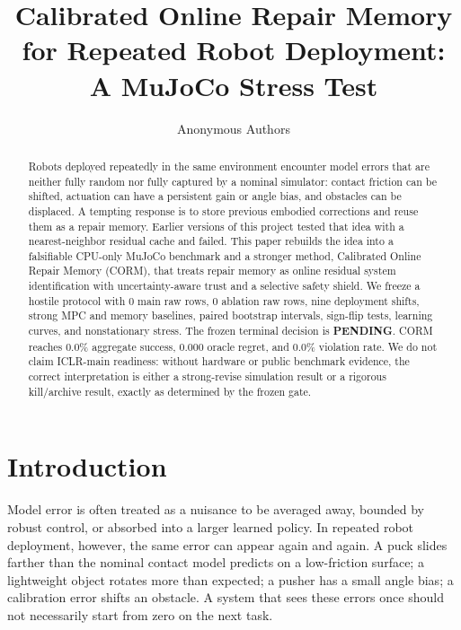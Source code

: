 \documentclass{article}
\title{Calibrated Online Repair Memory for Repeated Robot Deployment: A MuJoCo Stress Test}
\author{Anonymous Authors}
\newcommand{\TerminalDecision}{PENDING}
\newcommand{\MainRawRows}{0}
\newcommand{\AblationRawRows}{0}
\newcommand{\CORMAggSuccess}{0.0}
\newcommand{\CORMAggRegret}{0.000}
\newcommand{\CORMAggViolation}{0.0}
\begin{document}
\maketitle

\begin{abstract}
Robots deployed repeatedly in the same environment encounter model errors that are neither fully random nor fully captured by a nominal simulator: contact friction can be shifted, actuation can have a persistent gain or angle bias, and obstacles can be displaced. A tempting response is to store previous embodied corrections and reuse them as a repair memory. Earlier versions of this project tested that idea with a nearest-neighbor residual cache and failed. This paper rebuilds the idea into a falsifiable CPU-only MuJoCo benchmark and a stronger method, Calibrated Online Repair Memory (CORM), that treats repair memory as online residual system identification with uncertainty-aware trust and a selective safety shield. We freeze a hostile protocol with \MainRawRows{} main raw rows, \AblationRawRows{} ablation raw rows, nine deployment shifts, strong MPC and memory baselines, paired bootstrap intervals, sign-flip tests, learning curves, and nonstationary stress. The frozen terminal decision is \textbf{\TerminalDecision}. CORM reaches \CORMAggSuccess{}\% aggregate success, \CORMAggRegret{} oracle regret, and \CORMAggViolation{}\% violation rate. We do not claim ICLR-main readiness: without hardware or public benchmark evidence, the correct interpretation is either a strong-revise simulation result or a rigorous kill/archive result, exactly as determined by the frozen gate.
\end{abstract}

\section{Introduction}

Model error is often treated as a nuisance to be averaged away, bounded by robust control, or absorbed into a larger learned policy. In repeated robot deployment, however, the same error can appear again and again. A puck slides farther than the nominal contact model predicts on a low-friction surface; a lightweight object rotates more than expected; a pusher has a small angle bias; a calibration error shifts an obstacle. A system that sees these errors once should not necessarily start from zero on the next task.
\end{document}
